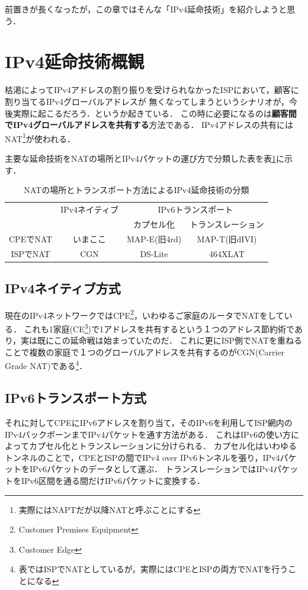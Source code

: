 前置きが長くなったが，この章ではそんな「IPv4延命技術」を紹介しようと思う．

\section{IPv4延命技術概観}

\lettrine{枯}
渇によってIPv4アドレスの割り振りを受けられなかったISPにおいて，顧客に割り当てるIPv4グローバルアドレスが
無くなってしまうというシナリオが，今後実際に起こるだろう．というか起きている．
この時に必要になるのは\textbf{顧客間でIPv4グローバルアドレスを共有する}方法である．
IPv4アドレスの共有にはNAT\footnote{実際にはNAPTだが以降NATと呼ぶことにする}が使われる．

主要な延命技術をNATの場所とIPv4パケットの運び方で分類した表を表\ref{yuyarin-nat-transport}に示す．

\begin{table}[htbp]
\begin{center}
\begin{tabular}{cccc} \hline
 & IPv4ネイティブ & \multicolumn{2}{c}{IPv6トランスポート} \\
 & & カプセル化 & トランスレーション \\\hline
CPEでNAT & いまここ & MAP-E(旧4rd) & MAP-T(旧dIVI) \\
ISPでNAT & CGN & DS-Lite & 464XLAT \\\hline
\end{tabular}
\end{center}
\caption{NATの場所とトランスポート方法によるIPv4延命技術の分類}
\label{yuyarin-nat-transport}
\end{table}

\subsection{IPv4ネイティブ方式}

現在のIPv4ネットワークではCPE\footnote{Customer Premises Equipment}，いわゆるご家庭のルータでNATをしている．
これも1家庭(CE\footnote{Customer Edge})で1アドレスを共有するという１つのアドレス節約術であり，実は既にこの延命戦は始まっていたのだ．
これに更にISP側でNATを重ねることで複数の家庭で１つのグローバルアドレスを共有するのがCGN(Carrier Grade NAT)である\footnote{表ではISPでNATとしているが，実際にはCPEとISPの両方でNATを行うことになる}．

\subsection{IPv6トランスポート方式}
それに対してCPEにIPv6アドレスを割り当て，そのIPv6を利用してISP網内のIPv4バックボーンまでIPv4パケットを通す方法がある．
これはIPv6の使い方によってカプセル化とトランスレーションに分けられる．
カプセル化はいわゆるトンネルのことで，CPEとISPの間でIPv4 over IPv6トンネルを張り，IPv4パケットをIPv6パケットのデータとして運ぶ．
トランスレーションではIPv4パケットをIPv6区間を通る間だけIPv6パケットに変換する．


